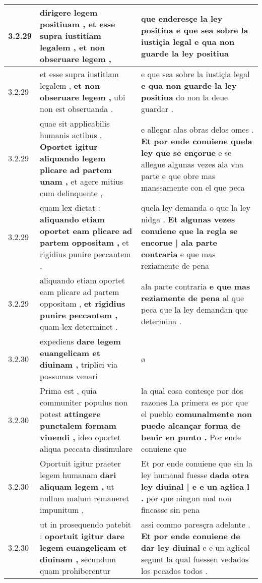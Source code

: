 \begin{tabular}{|p{1cm}|p{6.5cm}|p{6.5cm}|}
3.2.29 & dirigere legem positiuam , \textbf{ et esse supra iustitiam legalem , } et non obseruare legem , & que enderesçe la ley positiua \textbf{ e que sea sobre la iustiçia legal } e qua non guarde la ley positiua \\\hline
3.2.29 & et esse supra iustitiam legalem , \textbf{ et non obseruare legem , } ubi non est obseruanda . & e que sea sobre la iustiçia legal \textbf{ e qua non guarde la ley positiua } do non la deue guardar . \\\hline
3.2.29 & quae sit applicabilis humanis actibus . \textbf{ Oportet igitur aliquando legem plicare ad partem unam , } et agere mitius cum delinquente , & e allegar alas obras delos omes . \textbf{ Et por ende conuiene quela ley que se ençorue } e se allegue algunas vezes ala vna parte e que obre mas manssamente con el que peca \\\hline
3.2.29 & quam lex dictat : \textbf{ aliquando etiam oportet eam plicare ad partem oppositam , } et rigidius punire peccantem , & quela ley demanda o que la ley nidga . \textbf{ Et algunas vezes conuiene que la regla se encorue | ala parte contraria } e que mas reziamente de pena \\\hline
3.2.29 & aliquando etiam oportet eam plicare ad partem oppositam , \textbf{ et rigidius punire peccantem , } quam lex determinet . & ala parte contraria \textbf{ e que mas reziamente de pena } al que peca que la ley demandan que determina . \\\hline
3.2.30 & expediens \textbf{ dare legem euangelicam et diuinam , } triplici via possumus venari & ø \\\hline
3.2.30 & Prima est , quia communiter populus non potest \textbf{ attingere punctalem formam viuendi , } ideo oportet aliqua peccata dissimulare & la qual cosa contesçe por dos razones La primera es por que el pueblo \textbf{ comunalmente non puede alcançar forma de beuir en punto . } Por ende conuiene que \\\hline
3.2.30 & Oportuit igitur praeter legem humanam \textbf{ dari aliquam legem , } ut nullum malum remaneret impunitum , & Et por ende conuiene que sin la ley humanal fuesse \textbf{ dada otra ley diuinal | e e un agłica l . } por que ningun mal non fincasse sin pena \\\hline
3.2.30 & ut in prosequendo patebit : \textbf{ oportuit igitur dare legem euangelicam et diuinam , } secundum quam prohiberentur & assi commo paresçra adelante . \textbf{ Et por ende conuiene de dar ley diuinal } e e un agłical segunt la qual fuessen vedados los pecados todos . \\\hline

\end{tabular}
